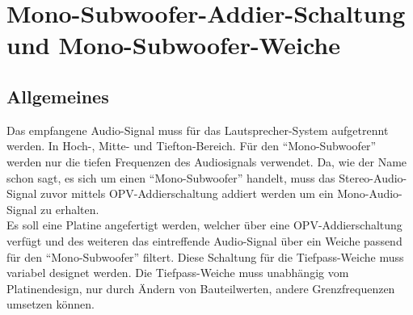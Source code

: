 \newpage
\section{Mono-Subwoofer-Addier-Schaltung und Mono-Subwoofer-Weiche}\label{sec:4.2}
\subsection{Allgemeines}\label{susec:4.2.1}
Das empfangene Audio-Signal muss für das Lautsprecher-System aufgetrennt werden. In Hoch-, Mitte- und Tiefton-Bereich.
Für den \enquote{Mono-Subwoofer} werden nur die tiefen Frequenzen des Audiosignals verwendet.
Da, wie der Name schon sagt, es sich um einen \enquote{Mono-Subwoofer} handelt, muss das Stereo-Audio-Signal zuvor mittels OPV-Addierschaltung addiert werden um ein Mono-Audio-Signal zu erhalten.\\
Es soll eine Platine angefertigt werden, welcher über eine OPV-Addierschaltung verfügt und des weiteren das eintreffende Audio-Signal über ein Weiche passend für den \enquote{Mono-Subwoofer} filtert.
Diese Schaltung für die Tiefpass-Weiche muss variabel designet werden. Die Tiefpass-Weiche muss unabhängig vom Platinendesign, nur durch Ändern von Bauteilwerten, andere Grenzfrequenzen umsetzen können.

